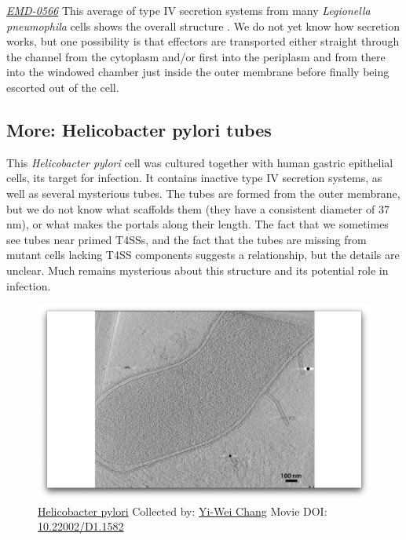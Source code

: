 \documentclass[]{tufte-book}
\begin{document}
\href{https://www.ebi.ac.uk/pdbe/entry/emdb/EMD-0566}{\emph{EMD-0566}}
This average of type IV secretion systems from many \emph{Legionella
pneumophila} cells shows the overall structure \citep{ghosal2019a}. We
do not yet know how secretion works, but one possibility is that
effectors are transported either straight through the channel from the
cytoplasm and/or first into the periplasm and from there into the
windowed chamber just inside the outer membrane before finally being
escorted out of the cell.

\hypertarget{Helicobacter_pylori_tubes}{\subsection*{More: Helicobacter
pylori tubes}\label{Helicobacter_pylori_tubes}}

This \emph{Helicobacter pylori} cell was cultured together with human
gastric epithelial cells, its target for infection. It contains inactive
type IV secretion systems, as well as several mysterious tubes. The
tubes are formed from the outer membrane, but we do not know what
scaffolds them (they have a consistent diameter of 37 nm), or what makes
the portals along their length. The fact that we sometimes see tubes
near primed T4SSs, and the fact that the tubes are missing from mutant
cells lacking T4SS components suggests a relationship, but the details
are unclear. Much remains mysterious about this structure and its
potential role in infection.





\begin{figure}
\includegraphics{movie_stills/9_3a} \caption[\protect\hyperlink{tree}{Helicobacter pylori} Collected by:
\protect\hyperlink{yi-wei_chang}{Yi-Wei Chang} Movie DOI:
\href{https://doi.org/10.22002/D1.1582}{10.22002/D1.1582}]{\protect\hyperlink{tree}{Helicobacter pylori} Collected by:
\protect\hyperlink{yi-wei_chang}{Yi-Wei Chang} Movie DOI:
\href{https://doi.org/10.22002/D1.1582}{10.22002/D1.1582}}\label{fig:9-3a}
\end{figure}
\end{document}

